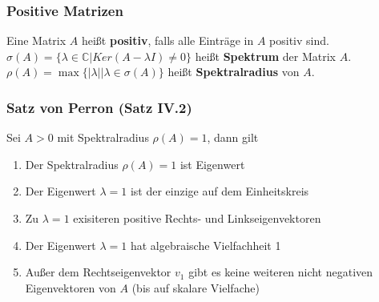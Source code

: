 \documentclass[]{article}
\begin{document}
\subsubsection*{Positive Matrizen}
Eine Matrix $A$ heißt \textbf{positiv}, falls alle Einträge in $A$ positiv sind. \\
$\sigma(A) = \{ \lambda \in \mathbb{C} | Ker(A - \lambda I) \neq 0 \}$ heißt \textbf{Spektrum} der Matrix $A$. \\
$\rho(A) = \max \{|\lambda| | \lambda \in \sigma(A) \}$ heißt \textbf{Spektralradius} von $A$.

\subsubsection*{Satz von Perron (Satz IV.2)}
Sei $A>0$ mit Spektralradius $\rho(A)=1$, dann gilt
\begin{enumerate}
	\item Der Spektralradius $\rho(A)=1$ ist Eigenwert
	\item Der Eigenwert $\lambda = 1$ ist der einzige auf dem Einheitskreis
	\item Zu $\lambda = 1$ exisiteren positive Rechts- und Linkseigenvektoren
	\item Der Eigenwert $\lambda=1$ hat algebraische Vielfachheit 1
	\item Außer dem Rechtseigenvektor $v_1$ gibt es keine weiteren nicht negativen Eigenvektoren von $A$ (bis auf skalare Vielfache)
\end{enumerate}
\end{document}
